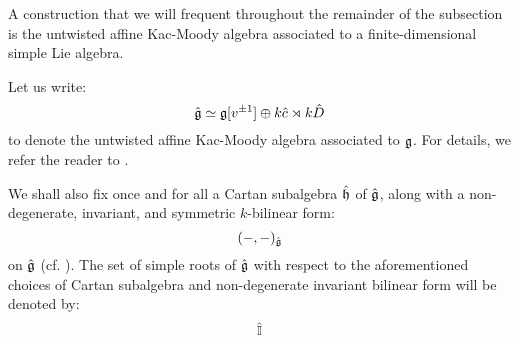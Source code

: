         A construction that we will frequent throughout the remainder of the subsection is the untwisted affine Kac-Moody algebra associated to a finite-dimensional simple Lie algebra.
        \begin{convention} \label{conv: a_fixed_untwisted_affine_kac_moody_algebra}
            Let us write:
                $$\hat{\mathfrak{g}} \simeq \mathfrak{g}[v^{\pm 1}] \oplus k \hat{c} \rtimes k \hat{D}$$
            to denote the untwisted affine Kac-Moody algebra associated to $\mathfrak{g}$. For details, we refer the reader to \cite[Chapter 7]{kac_infinite_dimensional_lie_algebras}.
            
            We shall also fix once and for all a Cartan subalgebra $\hat{\mathfrak{h}}$ of $\hat{\mathfrak{g}}$, along with a non-degenerate, invariant, and symmetric $k$-bilinear form:
                $$(-, -)_{\hat{\mathfrak{g}}}$$
            on $\hat{\mathfrak{g}}$ (cf. \cite[Chapter 2]{kac_infinite_dimensional_lie_algebras}). The set of simple roots of $\hat{\mathfrak{g}}$ with respect to the aforementioned choices of Cartan subalgebra and non-degenerate invariant bilinear form will be denoted by:
                $$\hat{\mathbb{I}}$$
        \end{convention}

